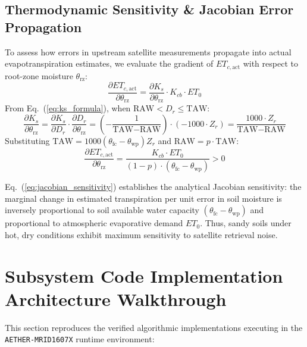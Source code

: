 \documentclass[11pt,a4paper]{article}
\theoremstyle{definition}
\theoremstyle{remark}
\begin{document}
\subsection{Thermodynamic Sensitivity \& Jacobian Error Propagation}
To assess how errors in upstream satellite measurements propagate into actual evapotranspiration estimates, we evaluate the gradient of $ET_{c,\text{act}}$ with respect to root-zone moisture $\theta_{\text{rz}}$:
\begin{equation}
    \frac{\partial ET_{c,\text{act}}}{\partial \theta_{\text{rz}}} = \frac{\partial K_s}{\partial \theta_{\text{rz}}} \cdot K_{cb} \cdot ET_0
\end{equation}
From Eq.~(\ref{eq:ks_formula}), when $\text{RAW} < D_r \le \text{TAW}$:
\begin{equation}
    \frac{\partial K_s}{\partial \theta_{\text{rz}}} = \frac{\partial K_s}{\partial D_r} \cdot \frac{\partial D_r}{\partial \theta_{\text{rz}}} = \left( -\frac{1}{\text{TAW} - \text{RAW}} \right) \cdot \left( -1000 \cdot Z_r \right) = \frac{1000 \cdot Z_r}{\text{TAW} - \text{RAW}}
\end{equation}
Substituting $\text{TAW} = 1000(\theta_{\text{fc}} - \theta_{\text{wp}})Z_r$ and $\text{RAW} = p \cdot \text{TAW}$:
\begin{equation}
    \label{eq:jacobian_sensitivity}
    \frac{\partial ET_{c,\text{act}}}{\partial \theta_{\text{rz}}} = \frac{K_{cb} \cdot ET_0}{(1 - p) \cdot (\theta_{\text{fc}} - \theta_{\text{wp}})} > 0
\end{equation}

\begin{tcolorbox}[colback=green!5!white,colframe=green!60!black,title=\textbf{Analytical Jacobian Sensitivity Invariant}]
\small
Eq.~(\ref{eq:jacobian_sensitivity}) establishes the analytical Jacobian sensitivity: the marginal change in estimated transpiration per unit error in soil moisture is inversely proportional to soil available water capacity $(\theta_{\text{fc}} - \theta_{\text{wp}})$ and proportional to atmospheric evaporative demand $ET_0$. Thus, sandy soils under hot, dry conditions exhibit maximum sensitivity to satellite retrieval noise.
\end{tcolorbox}


\section{Subsystem Code Implementation Architecture Walkthrough}

This section reproduces the verified algorithmic implementations executing in the \texttt{AETHER-MRID1607X} runtime environment:
\end{document}
